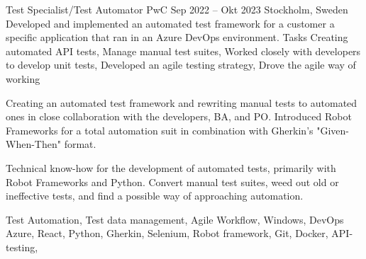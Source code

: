 \documentclass{sobCV}[2015/09/08]
\begin{document}
\experiencenode
{Test Specialist/Test Automator}
{PwC}
{Sep 2022 -- Okt 2023}
{Stockholm, Sweden}{
	Developed and implemented an automated test framework for a customer
	a specific application that ran in an Azure DevOps environment.
}
{Tasks}{
	Creating automated API tests,
	Manage manual test suites,
	Worked closely with developers to develop unit tests,
	Developed an agile testing strategy,
	Drove the agile way of working
}{  %
	{

		Creating an automated test framework and rewriting manual tests to
		automated ones in close collaboration with the developers, BA, and
		PO. Introduced Robot Frameworks for a total automation suit in
		combination with Gherkin's "Given-When-Then" format.

		Technical know-how for the development of automated tests, primarily
		with Robot Frameworks and Python. Convert manual test suites, weed
		out old or ineffective tests, and find a possible way of
		approaching automation.

	}
}{
	Test Automation,
	Test data management,
	Agile Workflow,
	Windows,
	DevOps Azure,
	React,
	Python,
	Gherkin,
	Selenium,
	Robot framework,
	Git,
	Docker,
	API-testing,

}
\end{document}
